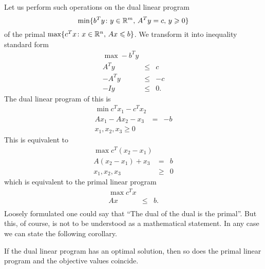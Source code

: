  Let us perform such operations  on the dual linear
 program 
 \begin{displaymath}
   \min\{ b^Ty \colon y \in \mathbb{R}^m, \, A^T y = c, \, y\geqslant0\}
 \end{displaymath}
 of the primal $\max\{c^T x \colon x \in \mathbb{R}^n, \, Ax \leqslant b\}$. 
 We transform it into inequality  standard form 
 \begin{displaymath}
   \begin{array}{rcl}
     \max - b^T y \\
     A^T y & \leq & c \\
     -A^Ty &\leq &-c\\
     -I y &\leq &0. 
   \end{array}
 \end{displaymath}
 The dual linear program of this is 
 \begin{displaymath}
   \begin{array}{rcl}
     \min c^T x_1 - c^T x_2  \\
     A x_1 - A x_2 - x_3 & = & -b \\
    x_1,x_2,x_3\geq0 &&
   \end{array}
 \end{displaymath}
 This is equivalent to 
 \begin{displaymath}
   \begin{array}{rcl}
     \max c^T (x_2-x_1) \\
     A (x_2-x_1) + x_3 & = & b \\
     x_1,x_2,x_3 & \geq & 0
   \end{array}
 \end{displaymath}
 which is equivalent to the primal linear program
 \begin{displaymath}
   \begin{array}{rcl}
     \max c^T x \\
     Ax & \leq & b. \\
   \end{array}
 \end{displaymath}
 Loosely formulated one could say that ``The dual of the dual is the
 primal''. But this, of course, is not to be understood as  a
 mathematical statement.  In any case we can state the following
 corollary. 

 \begin{corollary}
   \label{thr:5}
   If the dual linear program has an optimal solution, then so does the
   primal linear program and the objective values coincide.
 \end{corollary}



